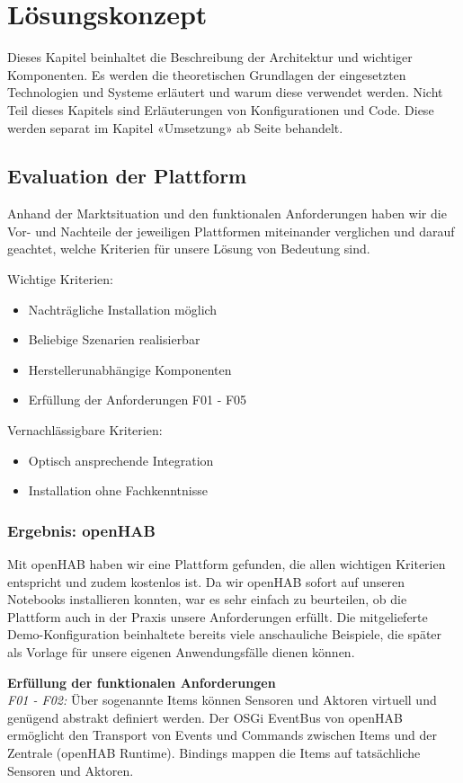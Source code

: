 \section{Lösungskonzept}
Dieses Kapitel beinhaltet die Beschreibung der Architektur und wichtiger Komponenten. Es werden die theoretischen Grundlagen der eingesetzten Technologien und Systeme erläutert und warum diese verwendet werden. Nicht Teil dieses Kapitels sind Erläuterungen von Konfigurationen und Code. Diese werden separat im Kapitel «Umsetzung» ab Seite \pageref{sec:chapterRealization} behandelt.

\subsection{Evaluation der Plattform}
Anhand der Marktsituation und den funktionalen Anforderungen haben wir die Vor- und Nachteile der jeweiligen Plattformen miteinander verglichen und darauf geachtet, welche Kriterien für unsere Lösung von Bedeutung sind.

Wichtige Kriterien:
\begin{itemize}
	\item Nachträgliche Installation möglich
	\item Beliebige Szenarien realisierbar
	\item Herstellerunabhängige Komponenten
	\item Erfüllung der Anforderungen F01 - F05
\end{itemize}

Vernachlässigbare Kriterien:
\begin{itemize}
	\item Optisch ansprechende Integration
	\item Installation ohne Fachkenntnisse
\end{itemize}

\subsubsection{Ergebnis: openHAB} 
Mit openHAB haben wir eine Plattform gefunden, die allen wichtigen Kriterien entspricht und zudem kostenlos ist. Da wir openHAB sofort auf unseren Notebooks installieren konnten, war es sehr einfach zu beurteilen, ob die Plattform auch in der Praxis unsere Anforderungen erfüllt. Die mitgelieferte Demo-Konfiguration beinhaltete bereits viele anschauliche Beispiele, die später als Vorlage für unsere eigenen Anwendungsfälle dienen können. 

\textbf{Erfüllung der funktionalen Anforderungen} \\
\textit{F01 - F02:} Über sogenannte Items können Sensoren und Aktoren virtuell und genügend abstrakt definiert werden. Der OSGi EventBus von openHAB ermöglicht den Transport von Events und Commands zwischen Items und der Zentrale (openHAB Runtime). Bindings mappen die Items auf tatsächliche Sensoren und Aktoren.

